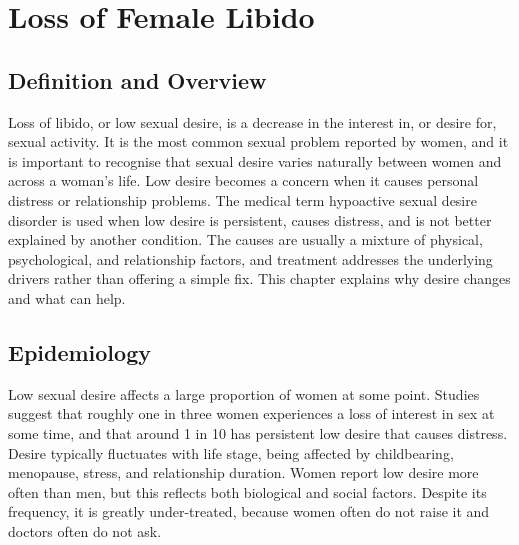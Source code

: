 \chapter{Loss of Female Libido}

\section*{Definition and Overview}
Loss of libido, or low sexual desire, is a decrease in the interest in, or desire for, sexual activity. It is the most common sexual problem reported by women, and it is important to recognise that sexual desire varies naturally between women and across a woman's life. Low desire becomes a concern when it causes personal distress or relationship problems. The medical term hypoactive sexual desire disorder is used when low desire is persistent, causes distress, and is not better explained by another condition. The causes are usually a mixture of physical, psychological, and relationship factors, and treatment addresses the underlying drivers rather than offering a simple fix. This chapter explains why desire changes and what can help.

\section*{Epidemiology}
Low sexual desire affects a large proportion of women at some point. Studies suggest that roughly one in three women experiences a loss of interest in sex at some time, and that around 1 in 10 has persistent low desire that causes distress. Desire typically fluctuates with life stage, being affected by childbearing, menopause, stress, and relationship duration. Women report low desire more often than men, but this reflects both biological and social factors. Despite its frequency, it is greatly under-treated, because women often do not raise it and doctors often do not ask.

